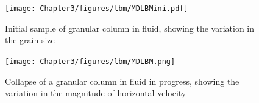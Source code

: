 \begin{figure}[htbp]
\centering
\texttt{[image: Chapter3/figures/lbm/MDLBMini.pdf]}
\caption{Initial sample of granular column in fluid, showing the variation in the grain size}
\label{fig:LBMMDini}
\end{figure}


\begin{figure}[htbp]
\centering
\texttt{[image: Chapter3/figures/lbm/MDLBM.png]}
\caption{Collapse of a granular column in fluid in progress, showing the variation in the magnitude of horizontal velocity}
\label{fig:MDLBM}
\end{figure}
%
%
